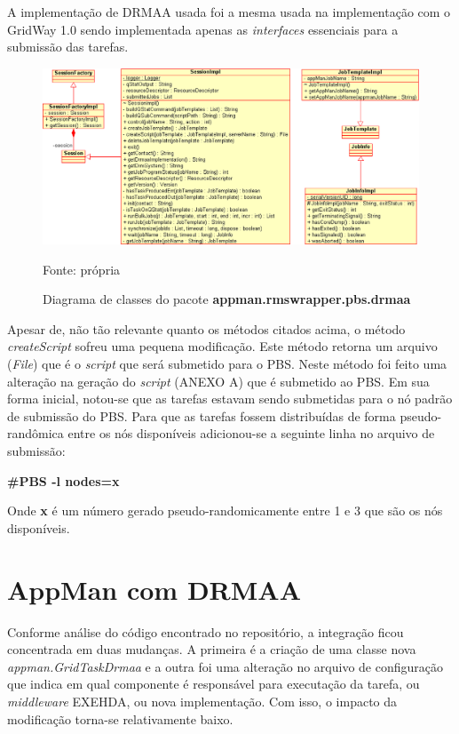 A implementação de DRMAA usada foi a mesma usada na implementação com o GridWay 1.0 \cite{Herrera2007} sendo implementada apenas as \emph{interfaces} essenciais para a submissão das tarefas. 

\begin{figure}[htb]
\begin{center}
\includegraphics[scale=0.5]{./img/drmaaUML2.eps}
\caption{Diagrama de classes do pacote \textbf{appman.rmswrapper.pbs.drmaa}}
\label{fig:UML_DRMAA}
Fonte: própria
\end{center}
\end{figure}

Apesar de, não tão relevante quanto os métodos citados acima, o método \emph{createScript} sofreu uma pequena modificação. Este método retorna um arquivo (\emph{File}) que é o \emph{script} que será submetido para o PBS. Neste método foi feito uma alteração na geração do \emph{script} (ANEXO A) que é submetido ao PBS. Em sua forma inicial, notou-se que as tarefas estavam sendo submetidas para o nó padrão de submissão do PBS. Para que as tarefas fossem distribuídas de forma pseudo-randômica entre os nós disponíveis adicionou-se a seguinte linha no arquivo de submissão:

\textbf{\#PBS -l nodes=x}

Onde \textbf{x} é um número gerado pseudo-randomicamente entre 1 e 3 que são os nós disponíveis.

\section{AppMan com DRMAA}

Conforme análise do código encontrado no repositório, a integração ficou concentrada em duas mudanças. A primeira é a criação de uma classe nova \emph{appman.GridTaskDrmaa} e a outra foi uma alteração no arquivo de configuração que indica em qual componente é responsável para executação da tarefa, ou \emph{middleware} EXEHDA, ou nova implementação. Com isso, o impacto da modificação torna-se relativamente baixo. 

